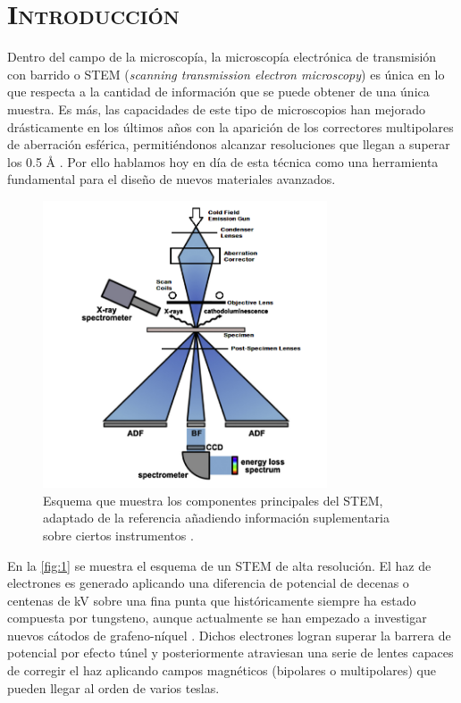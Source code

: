 \section*{\centering\scshape\Huge Introducción}
 \normalsize

Dentro del campo de la microscopía, la microscopía electrónica de transmisión con barrido o STEM (\textit{scanning transmission electron microscopy}) es única en lo que respecta a la cantidad de información que se puede obtener de una única muestra. Es más, las capacidades de este tipo de microscopios han mejorado drásticamente en los últimos años con la aparición de los correctores multipolares de aberración esférica, permitiéndonos alcanzar resoluciones que llegan a superar los 0.5 Å \cite{STEM_basics}\cite{tesis_gabriel}. Por ello hablamos hoy en día de esta técnica como una herramienta fundamental para el diseño de nuevos materiales avanzados.\\

\begin{figure}[h!]
    \centering
    \includegraphics[width=0.75\textwidth]{fig/Fig1.png}
    \caption{Esquema que muestra los componentes principales del STEM, adaptado de la referencia \cite{foto_intro} añadiendo información suplementaria sobre ciertos instrumentos \cite{maria}.}
    \label{fig:1}
\end{figure}

En la \autoref{fig:1} se muestra el esquema de un STEM de alta resolución. El haz de electrones es generado aplicando una diferencia de potencial de decenas o centenas de kV sobre una fina punta que históricamente siempre ha estado compuesta por tungsteno, aunque actualmente se han empezado a investigar nuevos cátodos de grafeno-níquel \cite{e_gun}. Dichos electrones logran superar la barrera de potencial por efecto túnel y posteriormente atraviesan una serie de lentes capaces de corregir el haz aplicando campos magnéticos (bipolares o multipolares) que pueden llegar al orden de varios teslas.\\

